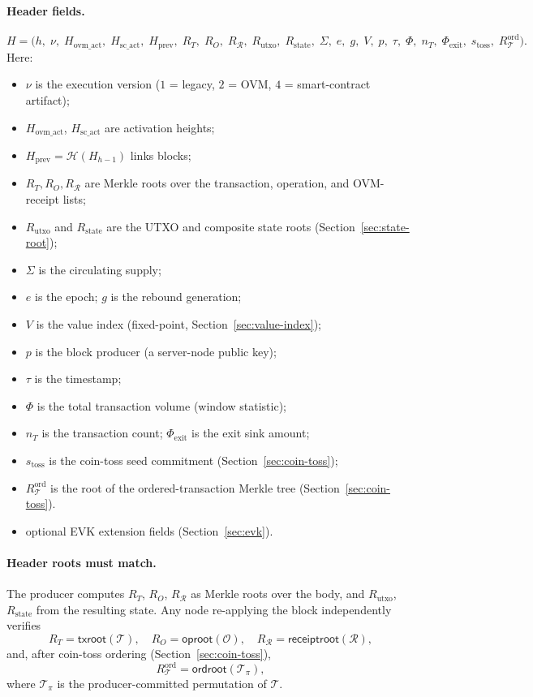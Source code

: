 \documentclass[11pt,a4paper]{article}
\theoremstyle{definition}
\newcommand{\ovm}{\textsf{OVM}}
\newcommand{\hash}{\mathcal{H}}
\begin{document}
\paragraph{Header fields.}
\[
H = \bigl(
  h,\; \nu,\; H_{\mathrm{ovm\_act}},\; H_{\mathrm{sc\_act}},\;
  H_{\mathrm{prev}},\; R_T,\; R_O,\; R_{\mathcal{R}},\;
  R_{\mathrm{utxo}},\; R_{\mathrm{state}},\;
  \Sigma,\; e,\; g,\; V,\; p,\; \tau,\;
  \Phi,\; n_T,\; \Phi_{\mathrm{exit}},\;
  s_{\mathrm{toss}},\; R_{\mathcal{T}}^{\mathrm{ord}}
\bigr).
\]
Here:
\begin{itemize}[leftmargin=2em]
  \item $\nu$ is the execution version ($1$ = legacy, $2$ = \ovm{}, $4$ =
    smart-contract artifact);
  \item $H_{\mathrm{ovm\_act}}$, $H_{\mathrm{sc\_act}}$ are activation heights;
  \item $H_{\mathrm{prev}} = \hash(H_{h-1})$ links blocks;
  \item $R_T, R_O, R_{\mathcal{R}}$ are Merkle roots over the transaction,
    operation, and OVM-receipt lists;
  \item $R_{\mathrm{utxo}}$ and $R_{\mathrm{state}}$ are the UTXO and composite
    state roots (Section~\ref{sec:state-root});
  \item $\Sigma$ is the circulating supply;
  \item $e$ is the epoch; $g$ is the rebound generation;
  \item $V$ is the value index (fixed-point, Section~\ref{sec:value-index});
  \item $p$ is the block producer (a server-node public key);
  \item $\tau$ is the timestamp;
  \item $\Phi$ is the total transaction volume (window statistic);
  \item $n_T$ is the transaction count; $\Phi_{\mathrm{exit}}$ is the exit sink amount;
  \item $s_{\mathrm{toss}}$ is the coin-toss seed commitment (Section~\ref{sec:coin-toss});
  \item $R_{\mathcal{T}}^{\mathrm{ord}}$ is the root of the ordered-transaction
    Merkle tree (Section~\ref{sec:coin-toss}).
  \item optional EVK extension fields (Section~\ref{sec:evk}).
\end{itemize}

\paragraph{Header roots must match.}
The producer computes $R_T$, $R_O$, $R_{\mathcal{R}}$ as Merkle roots over the
body, and $R_{\mathrm{utxo}}$, $R_{\mathrm{state}}$ from the resulting state.
Any node re-applying the block independently verifies
\[
R_T = \mathsf{txroot}(\mathcal{T}),\quad
R_O = \mathsf{oproot}(\mathcal{O}),\quad
R_{\mathcal{R}} = \mathsf{receiptroot}(\mathcal{R}),
\]
and, after coin-toss ordering (Section~\ref{sec:coin-toss}),
\[
R_{\mathcal{T}}^{\mathrm{ord}}
   = \mathsf{ordroot}(\mathcal{T}_{\pi}),
\]
where $\mathcal{T}_{\pi}$ is the producer-committed permutation of $\mathcal{T}$.
\end{document}
